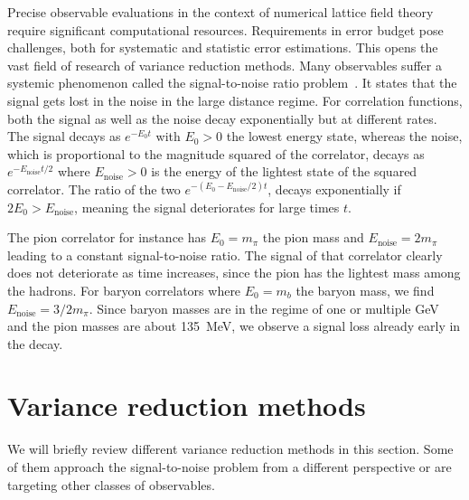 Precise observable evaluations in the context of numerical lattice field theory require significant computational resources.
Requirements in error budget pose challenges, both for systematic and statistic error estimations.
This opens the vast field of research of variance reduction methods.
Many observables suffer a systemic phenomenon called the signal-to-noise ratio problem~\cite{parisi1984,lepage1989}.
It states that the signal gets lost in the noise in the large distance regime.
For correlation functions, both the signal as well as the noise decay exponentially but at different rates.
The signal decays as $e^{-E_0 t}$ with $E_0 > 0$ the lowest energy state, whereas the noise, which is proportional to the magnitude squared of the correlator, decays as $e^{-E_{\text{noise}}t/2}$ where $E_{\text{noise}} > 0$ is the energy of the lightest state of the squared correlator.
The ratio of the two $e^{-(E_0 - E_{\text{noise}}/2)t}$, decays exponentially if $2E_0 > E_{\text{noise}}$, meaning the signal deteriorates for large times $t$.

The pion correlator for instance has $E_0 = m_{\pi}$ the pion mass and $E_{\text{noise}} = 2 m_{\pi}$ leading to a constant signal-to-noise ratio.
The signal of that correlator clearly does not deteriorate as time increases, since the pion has the lightest mass among the hadrons.
For baryon correlators where $E_0 = m_{b}$ the baryon mass, we find $E_{\text{noise}} = 3/2 m_{\pi}$.
Since baryon masses are in the regime of one or multiple GeV and the pion masses are about \SI{135}{\mega \eV}, we observe a signal loss already early in the decay.

\section{Variance reduction methods}

We will briefly review different variance reduction methods in this section.
Some of them approach the signal-to-noise problem from a different perspective or are targeting other classes of observables.

